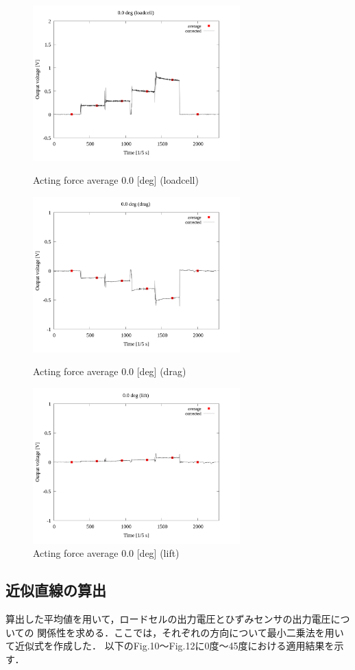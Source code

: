 \documentclass[twocolumn,a4j]{jsarticle}
\begin{document}
\begin{figure}[htbp]
    \footnotesize
    \begin{center}
        \includegraphics[width=80mm]{../images_2/03-1_loadcell/03_loadcell_average_0.png}
        \caption{Acting force average 0.0 [deg] (loadcell)}
        \includegraphics[width=80mm]{../images_2/03-2_drag/03_drag_average_0.png}
        \caption{Acting force average 0.0 [deg] (drag)}
        \includegraphics[width=80mm]{../images_2/03-3_lift/03_lift_average_0.png}
        \caption{Acting force average 0.0 [deg] (lift)}
    \end{center}
\end{figure}

\newpage

\subsection{近似直線の算出}
算出した平均値を用いて，ロードセルの出力電圧とひずみセンサの出力電圧についての
関係性を求める．ここでは，それぞれの方向について最小二乗法を用いて近似式を作成した．
以下のFig.10～Fig.12に0度～45度における適用結果を示す．
\end{document}
